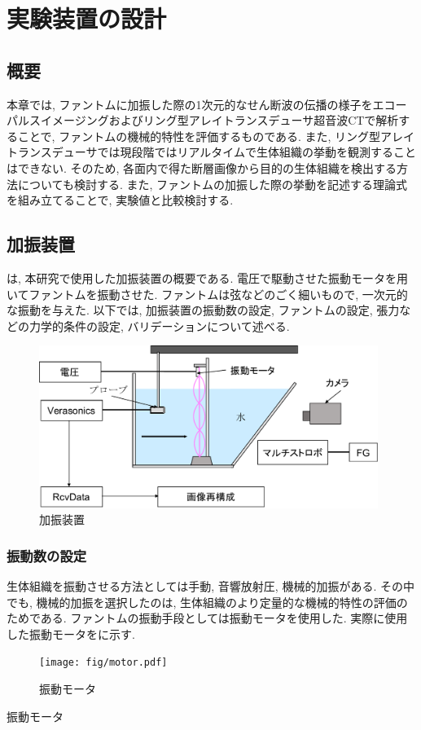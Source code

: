 \chapter{実験装置の設計\label{devicesection}}
\newpage
\section{概要}
本章では, ファントムに加振した際の1次元的なせん断波の伝播の様子をエコーパルスイメージングおよびリング型アレイトランスデューサ超音波CTで解析することで, ファントムの機械的特性を評価するものである. また, リング型アレイトランスデューサでは現段階ではリアルタイムで生体組織の挙動を観測することはできない. そのため, 各面内で得た断層画像から目的の生体組織を検出する方法についても検討する. また, ファントムの加振した際の挙動を記述する理論式を組み立てることで, 実験値と比較検討する.
\section{加振装置}
は, 本研究で使用した加振装置の概要である. 電圧で駆動させた振動モータを用いてファントムを振動させた. ファントムは弦などのごく細いもので, 一次元的な振動を与えた. 以下では, 加振装置の振動数の設定, ファントムの設定, 張力などの力学的条件の設定, バリデーションについて述べる. 
\begin{figure}[H]
  \begin{center}
    \includegraphics[width=110mm]{fig/jikkendevice.pdf}
  \end{center}
  \caption{加振装置}
\end{figure}
\subsection{振動数の設定}
生体組織を振動させる方法としては手動, 音響放射圧, 機械的加振がある. その中でも, 機械的加振を選択したのは, 生体組織のより定量的な機械的特性の評価のためである. ファントムの振動手段としては振動モータを使用した. 実際に使用した振動モータをに示す.
\begin{figure}[H]
  \begin{center}
    \texttt{[image: fig/motor.pdf]}
  \end{center}
  \caption{振動モータ}
\end{figure}
振動モータ
